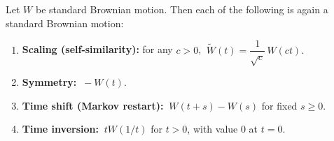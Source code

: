 \begin{proposition}[Invariances]
\label{ch29:prop-invariance}
Let $W$ be standard Brownian motion. Then each of the following is again a
standard Brownian motion:
\begin{enumerate}
  \item \textbf{Scaling (self-similarity):} for any $c>0$,
  $\ \widetilde W(t) = \dfrac{1}{\sqrt c}\,W(ct).$
  \item \textbf{Symmetry:} $\ -W(t).$
  \item \textbf{Time shift (Markov restart):} $\ W(t+s)-W(s)$ for fixed $s\ge0$.
  \item \textbf{Time inversion:} $\ tW(1/t)$ for $t>0$, with value $0$ at $t=0$.
\end{enumerate}
\end{proposition}

